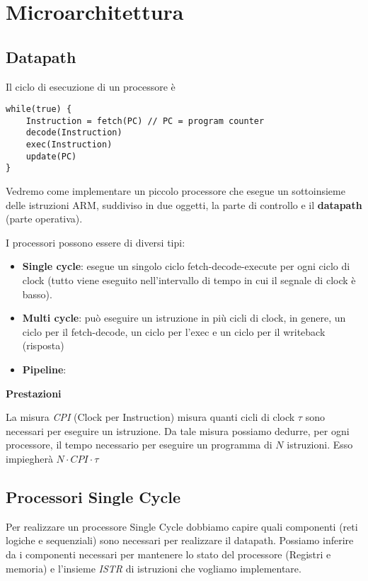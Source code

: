 \chapter{Microarchitettura}

\section{Datapath}

Il ciclo di esecuzione di un processore è

\begin{lstlisting}[frame=single]
while(true) {
    Instruction = fetch(PC) // PC = program counter
    decode(Instruction)
    exec(Instruction)
    update(PC)
}
\end{lstlisting}

Vedremo come implementare un piccolo processore che esegue un sottoinsieme delle istruzioni ARM,
suddiviso in due oggetti, la parte di controllo e il \textbf{datapath} (parte operativa).

I processori possono essere di diversi tipi:
\begin{itemize}
    \item \textbf{Single cycle}: esegue un singolo ciclo fetch-decode-execute per ogni ciclo di clock (tutto viene eseguito nell'intervallo di tempo in cui il segnale di clock è basso).
    \item \textbf{Multi cycle}: può eseguire un istruzione in più cicli di clock, in genere, un ciclo per il fetch-decode, un ciclo per l'exec e un ciclo per il writeback (risposta)
    \item \textbf{Pipeline}:
\end{itemize}

\begin{note}
    \textbf{Prestazioni}

    La misura \textit{CPI} (Clock per Instruction) misura quanti cicli di clock $\tau$ sono necessari per eseguire un istruzione.
    Da tale misura possiamo dedurre, per ogni processore, il tempo necessario per eseguire un programma di $N$ istruzioni.
    Esso impiegherà $N \cdot CPI \cdot \tau $
\end{note}


\section{Processori Single Cycle}

Per realizzare un processore Single Cycle dobbiamo capire quali componenti (reti logiche e sequenziali) sono
necessari per realizzare il datapath. Possiamo inferire da i componenti necessari per mantenere lo stato del processore (Registri e memoria)
e l'insieme \textit{ISTR} di istruzioni che vogliamo implementare.


